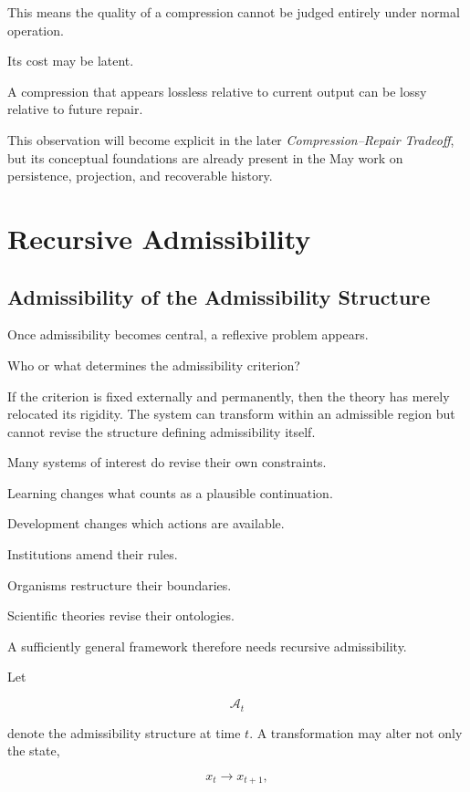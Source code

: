 \documentclass[11pt]{article}
\theoremstyle{remark}
\newcommand{\Adm}{\mathcal{A}}
\begin{document}
This means the quality of a compression cannot be judged entirely under normal operation.

Its cost may be latent.

A compression that appears lossless relative to current output can be lossy relative to future repair.

This observation will become explicit in the later \emph{Compression--Repair Tradeoff}, but its conceptual foundations are already present in the May work on persistence, projection, and recoverable history.

\section{Recursive Admissibility}

\subsection{Admissibility of the Admissibility Structure}

Once admissibility becomes central, a reflexive problem appears.

Who or what determines the admissibility criterion?

If the criterion is fixed externally and permanently, then the theory has merely relocated its rigidity. The system can transform within an admissible region but cannot revise the structure defining admissibility itself.

Many systems of interest do revise their own constraints.

Learning changes what counts as a plausible continuation.

Development changes which actions are available.

Institutions amend their rules.

Organisms restructure their boundaries.

Scientific theories revise their ontologies.

A sufficiently general framework therefore needs recursive admissibility.

Let

\begin{equation}
\Adm_t
\end{equation}

denote the admissibility structure at time $t$. A transformation may alter not only the state,

\begin{equation}
x_t\rightarrow x_{t+1},
\end{equation}
\end{document}

